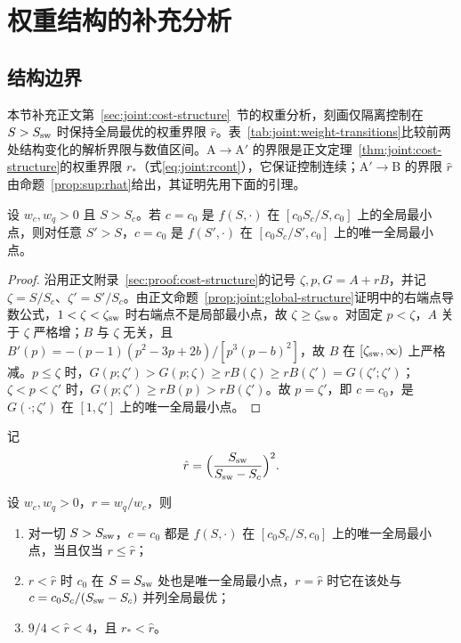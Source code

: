 \section{权重结构的补充分析}
\label{sec:sup:weight-structure}

\subsection{结构边界}
本节补充正文第~\ref{sec:joint:cost-structure}~节的权重分析，刻画仅隔离控制在 $S>S_{\rm sw}$ 时保持全局最优的权重界限 $\hat r$。表~\ref{tab:joint:weight-transitions}比较前两处结构变化的解析界限与数值区间。A$\to$A$'$ 的界限是正文定理~\ref{thm:joint:cost-structure}的权重界限 $r_*$（式\eqref{eq:joint:rcont}），它保证控制连续；A$'\to$B 的界限 $\hat r$ 由命题~\ref{prop:sup:rhat}给出，其证明先用下面的引理。
\begin{lemma}
\label{lem:sup:upper-set}
设 $w_c,w_q>0$ 且 $S>S_c$。若 $c=c_0$ 是 $f(S,\cdot)$ 在 $[c_0S_c/S,c_0]$ 上的全局最小点，则对任意 $S'>S$，$c=c_0$ 是 $f(S',\cdot)$ 在 $[c_0S_c/S',c_0]$ 上的唯一全局最小点。
\end{lemma}
\begin{proof}
沿用正文附录~\ref{sec:proof:cost-structure}的记号 $\zeta,p,G=A+rB$，并记 $\zeta=S/S_c$、$\zeta'=S'/S_c$。由正文命题~\ref{prop:joint:global-structure}证明中的右端点导数公式，$1<\zeta<\zeta_{\rm sw}$ 时右端点不是局部最小点，故 $\zeta\ge\zeta_{\rm sw}$。对固定 $p<\zeta$，$A$ 关于 $\zeta$ 严格增；$B$ 与 $\zeta$ 无关，且 $B'(p)=-(p-1)(p^2-3p+2b)/[p^3(p-b)^2]$，故 $B$ 在 $[\zeta_{\rm sw},\infty)$ 上严格减。$p\le\zeta$ 时，$G(p;\zeta')>G(p;\zeta)\ge rB(\zeta)\ge rB(\zeta')=G(\zeta';\zeta')$；$\zeta<p<\zeta'$ 时，$G(p;\zeta')\ge rB(p)>rB(\zeta')$。故 $p=\zeta'$，即 $c=c_0$，是 $G(\cdot;\zeta')$ 在 $[1,\zeta']$ 上的唯一全局最小点。
\end{proof}
记
\[
\hat r=\Bigl(\frac{S_{\rm sw}}{S_{\rm sw}-S_c}\Bigr)^2 .
\]
\begin{proposition}
\label{prop:sup:rhat}
设 $w_c,w_q>0$，$r=w_q/w_c$，则
\begin{enumerate}
\renewcommand{\labelenumi}{(\roman{enumi})}
\item 对一切 $S>S_{\rm sw}$，$c=c_0$ 都是 $f(S,\cdot)$ 在 $[c_0S_c/S,c_0]$ 上的唯一全局最小点，当且仅当 $r\le\hat r$；
\item $r<\hat r$ 时 $c_0$ 在 $S=S_{\rm sw}$ 处也是唯一全局最小点，$r=\hat r$ 时它在该处与 $c=c_0S_c/(S_{\rm sw}-S_c)$ 并列全局最优；
\item $9/4<\hat r<4$，且 $r_*<\hat r$。
\end{enumerate}
\end{proposition}
